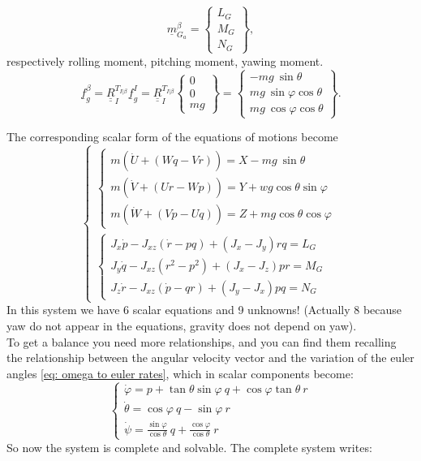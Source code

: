 \begin{equation}
\underline{m}_{G_a}^\beta =     \begin{Bmatrix}
        L_G\\M_G\\N_G
    \end{Bmatrix},
\end{equation}
respectively rolling moment, pitching moment, yawing moment.
\begin{equation}
\underline{f}_{g}^\beta =   \underline{\underline{R}}_I^{T_{I|\beta}}  \underline{f}_g^I = \underline{\underline{R}}_I^{T_{I|\beta}}  \begin{Bmatrix}
    0\\0\\mg
\end{Bmatrix} = \begin{Bmatrix}
    -mg~\sin\theta\\
    mg~\sin\varphi\cos\theta\\
    mg~\cos\varphi\cos\theta
\end{Bmatrix}.
\end{equation}

The corresponding scalar form of the equations of motions become
\begin{equation}
    \begin{cases}
        \begin{cases}
            m(\dot U + (Wq-Vr)) = X - mg~\sin\theta\\
            m(\dot V + (Ur-Wp)) = Y + wg \cos\theta \sin\varphi\\
            m(\dot W + (Vp -Uq)) = Z + mg\cos\theta \cos\varphi
        \end{cases}\\
        \begin{cases}
            J_x \dot p - J_{xz}(\dot r - pq) + (J_x - J_y) rq  = L_G\\
            J_y \dot q - J_{xz}(r^2 - p^2) + (J_x - J_z) pr  = M_G\\
            J_z \dot r - J_{xz}(\dot p - qr) + (J_y - J_x) pq  = N_G
        \end{cases}
    \end{cases}
\end{equation}
In this system we have 6 scalar equations and 9 unknowns! (Actually 8 because yaw do not appear in the equations, gravity does not depend on yaw).
\\
To get a balance you need more relationships, and you can find them recalling the relationship between the angular velocity vector and the variation of the euler angles \ref{eq: omega to euler rates}, which in scalar components become:
\begin{equation}
    \begin{cases}
        \dot \varphi = p + \tan\theta \sin\varphi ~q + \cos\varphi\tan\theta ~r\\
        \dot \theta =  \cos \varphi~q - \sin\varphi ~r\\
        \dot \psi = \frac{\sin\varphi}{\cos\theta}~q + \frac{\cos\varphi}{\cos\theta}~r
    \end{cases}
\end{equation}
So now the system is complete and solvable.
The complete system writes:


